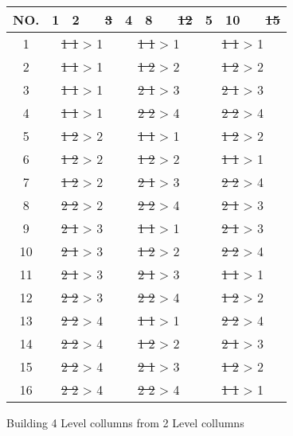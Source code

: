 \begin{figure}[H]
	\centering
	\begin{tabular}{ |c||cccc|cccc|cccc|  }
		\hline
		NO.& 1 & 2 & & \sout{3} & 4 & 8 & &  \sout{12} & 5 & 10 & &  \sout{15}\\
		\hline
		1  & \multicolumn{4}{c}{\sout{1 1} > 1 } & \multicolumn{4}{|c|}{\sout{1 1} > 1 } & \multicolumn{4}{c|}{\sout{1 1} > 1 }\\
		2  & \multicolumn{4}{c}{\sout{1 1} > 1 } & \multicolumn{4}{|c|}{\sout{1 2} > 2 } & \multicolumn{4}{c|}{\sout{1 2} > 2 }\\
		3  & \multicolumn{4}{c}{\sout{1 1} > 1 } & \multicolumn{4}{|c|}{\sout{2 1} > 3 } & \multicolumn{4}{c|}{\sout{2 1} > 3 }\\
		4  & \multicolumn{4}{c}{\sout{1 1} > 1 } & \multicolumn{4}{|c|}{\sout{2 2} > 4 } & \multicolumn{4}{c|}{\sout{2 2} > 4 }\\
		5  & \multicolumn{4}{c}{\sout{1 2} > 2 } & \multicolumn{4}{|c|}{\sout{1 1} > 1 } & \multicolumn{4}{c|}{\sout{1 2} > 2 }\\
		6  & \multicolumn{4}{c}{\sout{1 2} > 2 } & \multicolumn{4}{|c|}{\sout{1 2} > 2 } & \multicolumn{4}{c|}{\sout{1 1} > 1 }\\
		7  & \multicolumn{4}{c}{\sout{1 2} > 2 } & \multicolumn{4}{|c|}{\sout{2 1} > 3 } & \multicolumn{4}{c|}{\sout{2 2} > 4 }\\
		8  & \multicolumn{4}{c}{\sout{2 2} > 2 } & \multicolumn{4}{|c|}{\sout{2 2} > 4 } & \multicolumn{4}{c|}{\sout{2 1} > 3 }\\
		9  & \multicolumn{4}{c}{\sout{2 1} > 3 } & \multicolumn{4}{|c|}{\sout{1 1} > 1 } & \multicolumn{4}{c|}{\sout{2 1} > 3 }\\
		10 & \multicolumn{4}{c}{\sout{2 1} > 3 } & \multicolumn{4}{|c|}{\sout{1 2} > 2 } & \multicolumn{4}{c|}{\sout{2 2} > 4 }\\
		11 & \multicolumn{4}{c}{\sout{2 1} > 3 } & \multicolumn{4}{|c|}{\sout{2 1} > 3 } & \multicolumn{4}{c|}{\sout{1 1} > 1 }\\
		12 & \multicolumn{4}{c}{\sout{2 2} > 3 } & \multicolumn{4}{|c|}{\sout{2 2} > 4 } & \multicolumn{4}{c|}{\sout{1 2} > 2 }\\
		13 & \multicolumn{4}{c}{\sout{2 2} > 4 } & \multicolumn{4}{|c|}{\sout{1 1} > 1 } & \multicolumn{4}{c|}{\sout{2 2} > 4 }\\
		14 & \multicolumn{4}{c}{\sout{2 2} > 4 } & \multicolumn{4}{|c|}{\sout{1 2} > 2 } & \multicolumn{4}{c|}{\sout{2 1} > 3 }\\
		15 & \multicolumn{4}{c}{\sout{2 2} > 4 } & \multicolumn{4}{|c|}{\sout{2 1} > 3 } & \multicolumn{4}{c|}{\sout{1 2} > 2 }\\
		16 & \multicolumn{4}{c}{\sout{2 2} > 4 } & \multicolumn{4}{|c|}{\sout{2 2} > 4 } & \multicolumn{4}{c|}{\sout{1 1} > 1 }\\
		\hline
	\end{tabular}
	\caption{Building 4 Level collumns from 2 Level collumns}
\end{figure}

